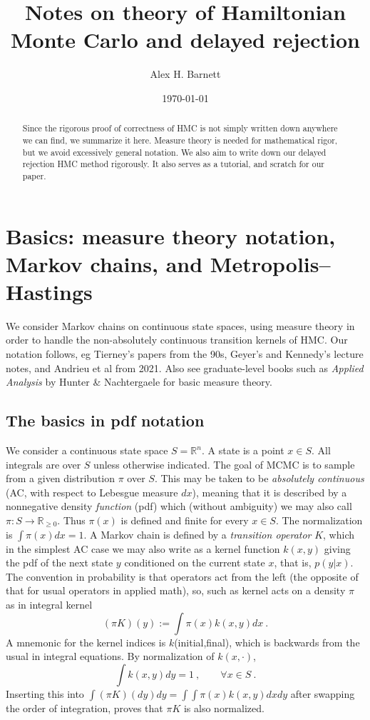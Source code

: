 \documentclass[10pt]{article}
\newcommand{\be}{\begin{equation}}
\newcommand{\ee}{\end{equation}}
\newcommand{\R}{\mathbb{R}}
\begin{document}
\title{Notes on theory of Hamiltonian Monte Carlo and delayed rejection}


\author{Alex H. Barnett}
\date{\today}
\maketitle

\begin{abstract}
  Since the rigorous proof of correctness of HMC is not simply written
  down anywhere we can find, we summarize it here.
  Measure theory is needed for mathematical rigor, but we avoid
  excessively general notation.
  We also aim to write down our delayed rejection HMC method rigorously.
  It also serves as a tutorial,
  and scratch for our paper.
\end{abstract}



\section{Basics: measure theory notation, Markov chains, and Metropolis--Hastings}

We consider Markov chains on continuous
state spaces, using measure theory in order to handle the non-absolutely
continuous transition kernels of HMC.
Our notation follows, eg Tierney's papers from the 90s, Geyer's and Kennedy's lecture notes, and Andrieu et al from 2021.
Also see graduate-level books such as {\em Applied Analysis} by Hunter \& Nachtergaele for basic measure theory.

\subsection{The basics in pdf notation}

We consider a continuous state space $S = \R^n$.
A state is a point $x\in S$.
All integrals are over $S$ unless otherwise indicated.
The goal of MCMC is to sample from a given distribution $\pi$ over $S$.
This may be taken to be
{\em absolutely continuous} (AC, with respect to
Lebesgue measure $dx$), meaning that it is described by a nonnegative
density {\em function} (pdf) which (without ambiguity) we may also call
$\pi: S \to \R_{\ge 0}$.
Thus $\pi(x)$ is defined and finite for every $x\in S$.
The normalization is $\int \pi(x) dx = 1$.
A Markov chain is defined by a {\em transition operator} $K$, which
in the simplest AC case we may also write as a kernel function
$k(x,y)$ giving the pdf
of the next state $y$ conditioned on
the current state $x$, that is, $p(y|x)$.
The convention in probability is that
operators act from the left
(the opposite of that for usual operators in applied math),
so, such as kernel acts on a density $\pi$ as in integral kernel
\be
(\pi K)(y) := \int \pi(x) k(x,y) dx~.
\label{piK}
\ee
A mnemonic for the kernel indices is $k$(initial,final), which is backwards
from the usual in integral equations.
By normalization of $k(x,\cdot)$,
\be
\int k(x,y) dy = 1~, \qquad \forall x\in S~.
\label{knorm}
\ee
Inserting this into
$\int (\pi K)(dy) dy = \int\int \pi(x) k(x,y) dx dy$ after swapping
the order of integration, proves that $\pi K$ is also normalized.
\end{document}
